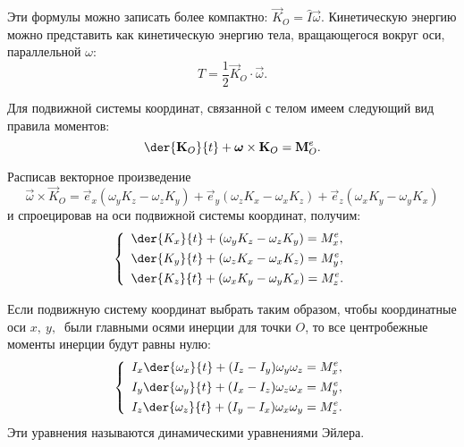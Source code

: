 Эти формулы можно записать более компактно: \( \vec{K}_O = \hat{I}\vec{\omega}
\). Кинетическую энергию можно представить как кинетическую энергию тела,
вращающегося вокруг оси, параллельной \( \omega \):
\[
    T = \frac{1}{2}\vec{K}_O\cdot\vec{\omega}.
\] 

Для подвижной системы координат, связанной с телом имеем следующий вид правила
моментов:
\[
    \der{\vec{K}_O}{t} + \vec{\omega} \times\vec{K}_O = \vec{M}^e_O.
\]

Расписав векторное произведение
\[
    \vec{\omega}\times\vec{K}_O = \vec{e}_x(\omega_y K_z - \omega_z K_y) +
    \vec{e}_y(\omega_z K_x - \omega_x K_z) + \vec{e}_z(\omega_x K_y -
    \omega_y K_x)
\]
и спроецировав на оси подвижной системы координат, получим:
\[
    \left\{ \begin{array}{l}
        \ds \der{K_x}{t} + (\omega_y K_z - \omega_z K_y) = M^e_x, \\[.4em]
        \ds \der{K_y}{t} + (\omega_z K_x - \omega_x K_z) = M^e_y, \\[.4em]
        \ds \der{K_z}{t} + (\omega_x K_y - \omega_y K_x) = M^e_z.
    \end{array} \right.
\]

Если подвижную систему координат выбрать таким образом, чтобы координатные оси
\( x,\ y,\ \) были главными осями инерции для точки \( O \), то все центробежные
моменты инерции будут равны нулю:
\[
    \left\{ \begin{array}{l}
        \ds I_x\der{\omega_x}{t} + (I_z -  I_y)\omega_y\omega_z = M^e_x, \\[.4em]
        \ds I_y\der{\omega_y}{t} + (I_x -  I_z)\omega_z\omega_x = M^e_y, \\[.4em]
        \ds I_z\der{\omega_z}{t} + (I_y -  I_x)\omega_x\omega_y = M^e_z.
    \end{array} \right.
\] 
Эти уравнения называются динамическими уравнениями Эйлера.

\newpage
